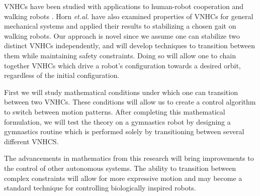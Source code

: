 \documentclass[a4paper,12pt]{article}
\begin{document}
VNHCs have been studied with applications to human-robot cooperation
\cite{vnhc-human-robot-coop} and walking robots \cite{vnhc-biped-robot}. Horn
\textit{et.al.} \cite{hybrid_zero_dynamics_bipedal_nhvcs} have also examined
properties of VNHCs for general mechanical systems and applied their results to
stabilizing a chosen gait on walking robots. Our approach is novel since we 
assume one can stabilize two distinct VNHCs independently, and will develop
techniques to transition between them while maintaining safety constraints.
Doing so will allow one to chain together VNHCs which drive a robot's
configuration towards a desired orbit, regardless of the initial configuration.

First we will study mathematical conditions under which one can transition
between two VNHCs. These conditions will allow us to create a control algorithm
to switch between motion patterns. After completing this mathematical
formulation, we will test the theory on a gymnastics robot by designing a
gymnastics routine which is performed solely by transitioning between several different
VNHCS. 

The advancements in mathematics from this research will bring improvements to
the control of other autonomous systems. The ability to transition between
complex constraints will allow for more expressive motion and may become
a standard technique for controlling biologically inspired robots.

\printbibliography
\end{document}
